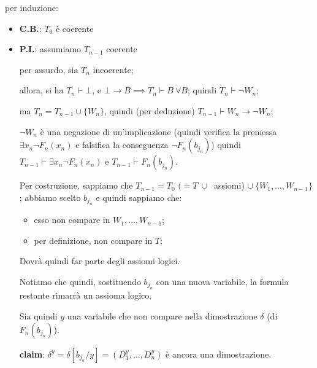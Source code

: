 \documentclass[a4paper,11pt]{report}
\begin{document}
\begin{proofframe}{}{}
    per induzione:

    \begin{itemize}
        \item \textbf{C.B.}: \( T_0 \) è coerente


        \item \textbf{P.I.}: assumiamo \( T_{n-1} \) coerente

            per assurdo, sia \( T_n \) incoerente;

            allora, si ha \( T_n \vdash \bot \), e \( \bot \to B \implies T_n \vdash B \ \forall B \); quindi \( T_n \vdash \neg W_n \);

            ma \( T_n = T_{n-1} \cup \{W_n\} \), quindi (per deduzione) \( T_{n-1} \vdash W_n \to \neg W_n \);

            {\color{gray}\small \( \neg W_n \) è una negazione di un'implicazione (quindi verifica la premessa \( \exists x_n \neg F_n (x_n) \) e falsifica la conseguenza \( \neg F_n (b_{j_n}) \))} quindi \( T_{n-1} \vdash \exists x_n \neg F_n (x_n)\) e \( T_{n-1} \vdash F_n (b_{j_n})  \).

        Per costruzione, sappiamo che \( T_{n-1} = T_0 \) {\color{gray}\small \( (= T \ \cup\ \) assiomi) } \( \cup \ \{W_1, \dots, W_{n-1}\} \); abbiamo scelto \( b_{j_n} \) e quindi sappiamo che:
        \begin{itemize}
            \item esso non compare in \( W_1, \dots, W_{n-1} \);
            \item per definizione, non compare in \( T \);
        \end{itemize}
            Dovrà quindi far parte degli assiomi logici.

            Notiamo che quindi, sostituendo \( b_{j_n} \) con una nuova variabile, la formula restante rimarrà un assioma logico.

            Sia quindi \( y \) una variabile che non compare nella dimostrazione \( \delta \) (di \( F_n(b_{j_n}) \)). 

            \textbf{claim}: \( \delta^y = \delta [b_{j_n}/y] = (D^y_1, \dots, D^y_n) \) è ancora una dimostrazione.


\end{itemize}
\end{proofframe}
\end{document}
